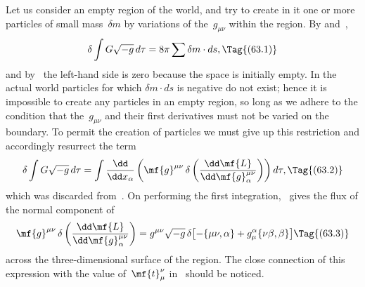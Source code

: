 \documentclass[12pt]{book}
\begin{document}
%
%

Let us consider an empty region of the world, and try to create in it one
or more particles of small mass~$\delta m$ by variations of the~$g_{\mu\nu}$ within the region.
By  and~,
\[
\delta \int G\sqrt{-g}\, d\tau = 8\pi \sum \delta m \cdot ds,
\Tag{(63.1)}
\]
and by~ the left-hand side is zero because the space is initially empty.
In the actual world particles for which $\delta m \cdot ds$ is negative do not exist; hence it
is impossible to create any particles in an empty region, so long as we adhere
to the condition that the~$g_{\mu\nu}$ and their first derivatives must not be varied on
the boundary. To permit the creation of particles we must give up this
restriction and accordingly resurrect the term
\[
\delta \int G\sqrt{-g}\, d\tau
= \int \frac{\dd}{\dd x_{\alpha}} \left(\mf{g}^{\mu\nu}\, \delta\left(\frac{\dd\mf{L}}{\dd\mf{g}_{\alpha}^{\mu\nu}}\right)\right) d\tau,
\Tag{(63.2)}
\]
which was discarded from~. On performing the first integration, ~gives
the flux of the normal component of
\[
\mf{g}^{\mu\nu}\, \delta\left(\frac{\dd\mf{L}}{\dd\mf{g}_{\alpha}^{\mu\nu}}\right)
= g^{\mu\nu} \sqrt{-g}\, \delta\bigl[-\{\mu\nu, \alpha\} + g_{\mu}^{\alpha} \{\nu\beta, \beta\}\bigr]
\Tag{(63.3)}
\]
across the three-dimensional surface of the region. The close connection of
this expression with the value of~$\mf{t}_{\mu}^{\nu}$ in~ should be noticed.
\end{document}
